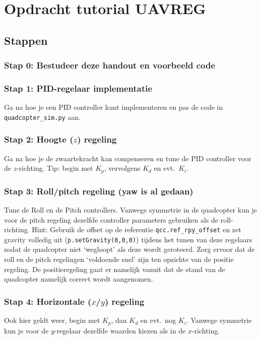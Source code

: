 \documentclass[a4paper,11pt]{article}
\begin{document}
\section{Opdracht tutorial UAVREG}

\subsection{Stappen}
\subsubsection{Stap 0: Bestudeer deze handout en voorbeeld code}
\subsubsection{Stap 1: PID-regelaar implementatie}
\label{sec:implementatie}
Ga na hoe je een PID controller kunt implementeren en pas de code in
\texttt{quadcopter\_sim.py} aan.
 
\subsubsection{Stap 2: Hoogte ($z$) regeling}
\label{sec:hoogte}
Ga na hoe je de zwaartekracht kan compenseren en tune de PID controller voor de $z$-richting. Tip: begin met $K_p$, vervolgens $K_d$ en evt.\ $K_i$.

\subsubsection{Stap 3: Roll/pitch regeling (yaw is al gedaan)}
\label{sec:rollpitch}
Tune de Roll en de Pitch controllers. Vanwege symmetrie in de quadcopter kun je voor de pitch regeling dezelfde controller parameters gebruiken als de roll-richting. Hint: Gebruik de offset op de referentie \texttt{qcc.ref\_rpy\_offset} en zet gravity volledig uit (\texttt{p.setGravity(0,0,0)}) tijdens het tunen van deze regelaars zodat de quadcopter niet `wegloopt'  als deze wordt geroteerd.
Zorg ervoor dat de roll en de pitch regelingen `voldoende snel' zijn ten opzichte van de positie regeling. De positieregeling gaat er namelijk vanuit dat de stand van de quadcopter namelijk correct wordt aangenomen. 

\subsubsection{Stap 4: Horizontale ($x$/$y$) regeling}
\label{sec:horizontaal}
Ook hier geldt weer, begin met $K_p$, dan $K_d$ en evt.\ nog $K_i$. Vanwege symmetrie kun je voor de $y$-regelaar dezelfde waarden kiezen als in de $x$-richting. 
\end{document}
